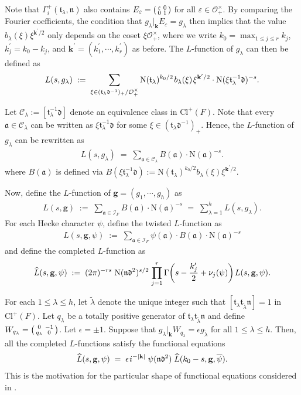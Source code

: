 \documentclass[11pt]{amsart}
\theoremstyle{remark}
\newcommand\sm[1]{\begin{psmallmatrix}#1\end{psmallmatrix}}
\newcommand\mbf[1]{\mathbf{#1}}
\newcommand\cl[1]{\mathcal{#1}}
\newcommand\fr[1]{\mathfrak{#1}}
\newcommand\ov[1]{\overline{#1}}
\newcommand\wt[1]{\widetilde{#1}}
\newcommand\wh[1]{\widehat{#1}}
\newcommand{\eps}{\varepsilon}
\newcommand{\clo}{\mathcal{O}}
\newcommand{\eq}{\;=\;}
\newcommand{\deq}{\;:=\;}
\def\thin{{\hskip 1pt}}
\newcommand{\N}{\mathrm{N}}
\newcommand{\Cl}{\mathrm{Cl}}
\begin{document}
Note that $\Gamma_i^+(\fr{t}_\lambda,\fr{n})$ also contains $E_\eps=\sm{\eps&0\\0&1}$ for all $\eps\in\clo_+^\times$. By comparing the Fourier coefficients, the condition that $g_\lambda|_\mbf{k}E_\eps=g_\lambda$ then implies that the value $b_\lambda(\xi)\xi^{\mbf{k}^\prime/2}$ only depends on the coset $\xi\clo_+^\times$, where we write $k_0=\max_{1\leq j\leq r}k_j$, $k_j^\prime=k_0-k_j$, and $\mbf{k}^\prime=(k_1^\prime,\cdots,k_r^\prime)$ as before. The $L$-function of $g_\lambda$ can then be defined as
\begin{align*}
    L(s,g_\lambda)\deq\sum_{\xi\in(\fr{t}_\lambda\fr{d}^{-1})_+/\clo_+^\times}\N(\fr{t}_\lambda)^{k_0/2}\thin b_\lambda(\xi)\thin \xi^{\mbf{k}^\prime/2}\cdot\N(\xi\fr{t}_\lambda^{-1}\fr{d})^{-s}.
\end{align*}

Let $\cl{C}_\lambda:=[\fr{t}_\lambda^{-1}\fr{d}]$ denote an equivalence class in $\Cl^+(F)$. Note that every $\fr{a}\in\cl{C}_\lambda$ can be written as $\xi\fr{t}_\lambda^{-1}\fr{d}$ for some $\xi\in(\fr{t}_\lambda\fr{d}^{-1})_+$. Hence, the $L$-function of $g_\lambda$ can be rewritten as
\begin{align*}
    L(s,g_\lambda)\eq\sum_{\fr{a}\in\cl{C}_\lambda}B(\fr{a})\cdot\N(\fr{a})^{-s}.
\end{align*}
where $B(\fr{a})$ is defined via $B(\xi\fr{t}_\lambda^{-1}\fr{d}):=\N(\fr{t}_\lambda)^{k_0/2}b_\lambda(\xi)\xi^{\mbf{k}^\prime/2}$.

Now, define the $L$-function of $\mbf{g}=(g_1,\cdots,g_h)$ as
\begin{align*}
    L(s,\mbf{g})\deq\sum_{\fr{a}\in\cl{I}_F}B(\fr{a})\cdot\N(\fr{a})^{-s}\eq\sum_{\lambda=1}^hL(s,g_\lambda).
\end{align*}
For each Hecke character $\psi$, define the twisted $L$-function as
\begin{align*}
    L(s,\mbf{g},\psi)\deq\sum_{\fr{a}\in\cl{I}_F}\psi(\fr{a})\cdot B(\fr{a})\cdot\N(\fr{a})^{-s}
\end{align*}
and define the completed $L$-function as
\begin{align*}
    \wh{L}(s,\mbf{g},\psi)\deq(2\pi)^{-rs}\; \N(\fr{n}\fr{d}^2)^{s/2}\thin\prod_{j=1}^r\Gamma\bigg(s-\frac{k_j^\prime}{2}+\nu_j(\psi)\bigg)\thin L(s,\mbf{g},\psi).
\end{align*}

For each $1\leq\lambda\leq h$, let $\wt{\lambda}$ denote the unique integer such that $[\fr{t}_\lambda\fr{t}_{\wt{\lambda}}\fr{n}]=1$ in $\Cl^+(F)$. Let $q_\lambda$ be a totally positive generator of $\fr{t}_\lambda\fr{t}_{\wt{\lambda}}\fr{n}$ and define $W_{q_\lambda}=\sm{0&-1\\q_\lambda&0}$. Let $\epsilon=\pm1$. Suppose that $g_\lambda|_\mbf{k}W_{q_\lambda}=\epsilon g_{\wt{\lambda}}$ for all $1\leq\lambda\leq h$. Then, all the completed $L$-functions satisfy the functional equations
\begin{align*}
    \wh{L}(s,\mbf{g},\psi)\eq \epsilon\thin i^{-|\mbf{k}|}\;\psi(\fr{n}\fr{d}^2)\;\wh{L}(k_0-s,\mbf{g},\ov{\psi}).
\end{align*}
This is the motivation for the particular shape of functional equations considered in .
\end{document}

